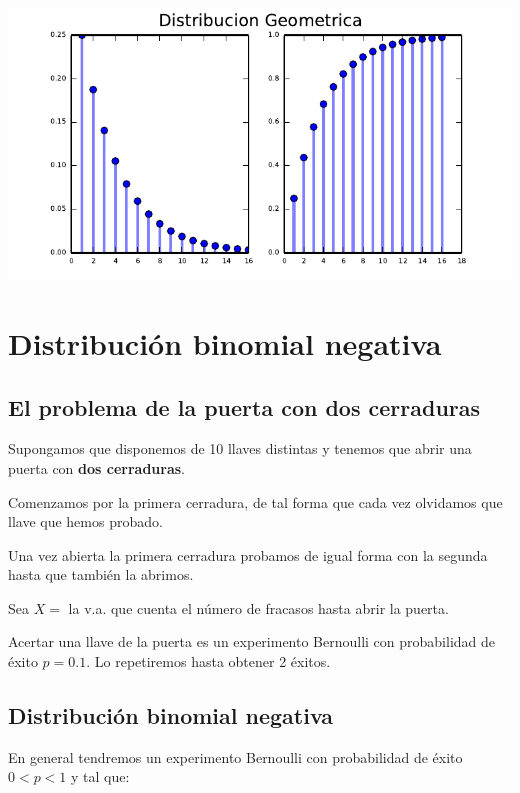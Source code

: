 \documentclass[]{book}
\begin{document}
\includegraphics{curso-probabilidad-udemy_files/figure-latex/unnamed-chunk-39-1.pdf}

\hypertarget{distribuciuxf3n-binomial-negativa}{%
\section{Distribución binomial negativa}\label{distribuciuxf3n-binomial-negativa}}

\hypertarget{el-problema-de-la-puerta-con-dos-cerraduras}{%
\subsection{El problema de la puerta con dos cerraduras}\label{el-problema-de-la-puerta-con-dos-cerraduras}}

Supongamos que disponemos de 10 llaves distintas y tenemos que abrir una puerta con \textbf{dos cerraduras}.

Comenzamos por la primera cerradura, de tal forma que cada vez olvidamos que llave que hemos probado.

Una vez abierta la primera cerradura probamos de igual forma con la segunda hasta que también la abrimos.

Sea \(X=\) la v.a. que cuenta el número de fracasos hasta abrir la puerta.

Acertar una llave de la puerta es un experimento Bernoulli con probabilidad de éxito \(p=0.1\). Lo repetiremos hasta obtener 2 éxitos.

\hypertarget{distribuciuxf3n-binomial-negativa-1}{%
\subsection{Distribución binomial negativa}\label{distribuciuxf3n-binomial-negativa-1}}

En general tendremos un experimento Bernoulli con probabilidad de éxito \(0<p<1\) y tal que:
\end{document}
